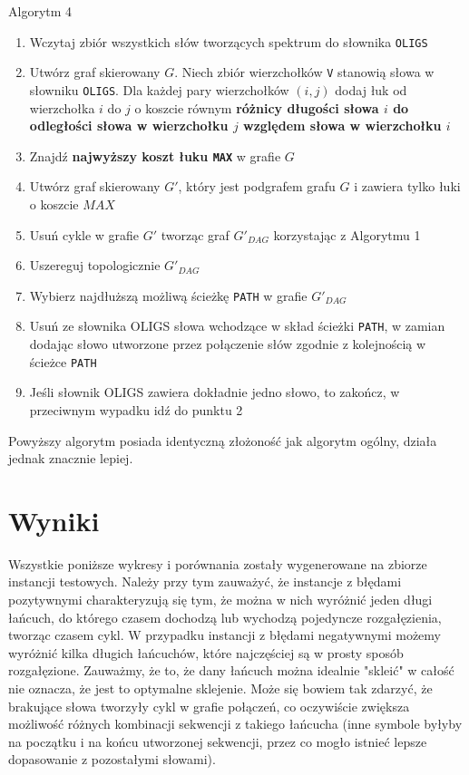 \documentclass[a4paper,10pt]{article}
\begin{document}
Algorytm 4
\begin{enumerate}
 \item Wczytaj zbiór wszystkich słów tworzących spektrum do słownika \texttt{OLIGS}
 \item Utwórz graf skierowany $G$. Niech zbiór wierzchołków \texttt{V} stanowią słowa w słowniku \texttt{OLIGS}. 
       Dla każdej pary wierzchołków $(i,j)$ dodaj łuk od wierzchołka $i$ do $j$ o koszcie równym 
       {\bf różnicy długości słowa $i$ do odległości słowa w wierzchołku $j$ względem słowa w wierzchołku $i$}
 \item Znajdź {\bf najwyższy koszt łuku \texttt{MAX}} w grafie $G$
 \item Utwórz graf skierowany $G'$, który jest podgrafem grafu $G$ i zawiera tylko łuki o koszcie $MAX$
 \item Usuń cykle w grafie $G'$ tworząc graf $G'_{DAG}$ korzystając z Algorytmu 1
 \item Uszereguj topologicznie $G'_{DAG}$
 \item Wybierz najdłuższą możliwą ścieżkę \texttt{PATH} w grafie $G'_{DAG}$
 \item Usuń ze słownika OLIGS słowa wchodzące w skład ścieżki \texttt{PATH}, w zamian dodając słowo utworzone przez połączenie słów zgodnie z kolejnością w ścieżce \texttt{PATH}
 \item Jeśli słownik OLIGS zawiera dokładnie jedno słowo, to zakończ, w przeciwnym wypadku idź do punktu 2
\end{enumerate}

Powyższy algorytm posiada identyczną złożoność jak algorytm ogólny, działa jednak znacznie lepiej.

\section{Wyniki}

Wszystkie poniższe wykresy i porównania zostały wygenerowane na zbiorze instancji testowych. Należy przy tym zauważyć, że instancje z błędami pozytywnymi charakteryzują się tym, że można w nich wyróżnić jeden długi łańcuch, do którego czasem dochodzą lub wychodzą pojedyncze rozgałęzienia, tworząc czasem cykl. W przypadku instancji z błędami negatywnymi możemy wyróżnić kilka długich łańcuchów, które najczęściej są w prosty sposób rozgałęzione. Zauważmy, że to, że dany łańcuch można idealnie "skleić" w całość nie oznacza, że jest to optymalne sklejenie. Może się bowiem tak zdarzyć, że brakujące słowa tworzyły cykl w grafie połączeń, co oczywiście zwiększa możliwość różnych kombinacji sekwencji z takiego łańcucha (inne symbole byłyby na początku i na końcu utworzonej sekwencji, przez co mogło istnieć lepsze dopasowanie z pozostałymi słowami).
\end{document}

